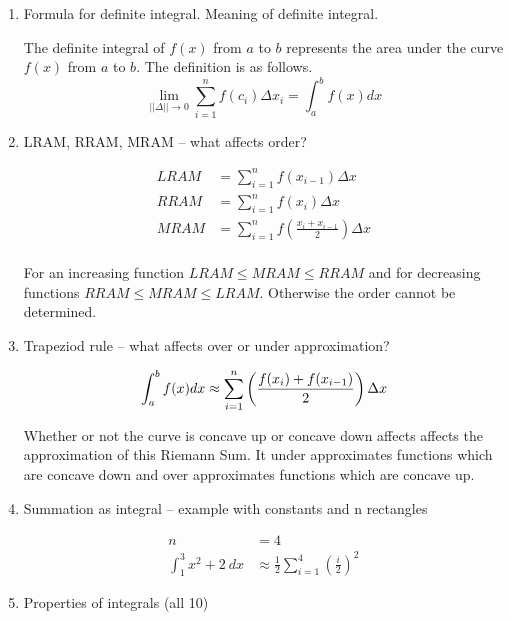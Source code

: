 \documentclass[fleqn]{article}
\begin{document}
\begin{enumerate}
\item Formula for definite integral. Meaning of definite integral.

The definite integral of $f(x)$ from $a$ to $b$ represents the area under the curve $f(x)$ from $a$ to $b$. The definition is as follows.
\begin{equation*}
\lim _{||\Delta||\rightarrow 0} \sum_{i = 1}^n f(c_i)\Delta x_i = \int_a^b f(x)dx
\end{equation*}

\item LRAM, RRAM, MRAM -- what affects order?

\begin{align*}
LRAM &= \sum_{i = 1}^{n} f(x_{i-1})\Delta x\\
RRAM &= \sum_{i = 1}^{n} f(x_i)\Delta x\\
MRAM &= \sum_{i = 1}^{n} f(\frac{x_i + x_{i-1}}{2})\Delta x\\
\end{align*}

For an increasing function $LRAM \leq MRAM \leq RRAM$ and for decreasing functions \newline $RRAM \leq MRAM \leq LRAM$. Otherwise the order cannot be determined.

\item Trapeziod rule -- what affects over or under approximation?

\begin{equation*}
\int _a^b f(x)dx \approx \sum_{i = 1}^{n} \left(\frac{f(x_i)+f(x_{i-1})}{2}\right)\Delta x\\
\end{equation*}

Whether or not the curve is concave up or concave down affects affects the approximation of this Riemann Sum. It under approximates functions which are concave down and over approximates functions which are concave up.

\item Summation as integral -- example with constants and n rectangles

\begin{align*}
n &= 4\\
\int _1^3 x^2 + 2 \ dx &\approx \frac{1}{2} \sum _{i=1}^4 \left(\frac{i}{2}\right)^2
\end{align*}

\item Properties of integrals (all 10)
\begin {enumerate}


\end{enumerate}
\end{enumerate}
\end{document}
